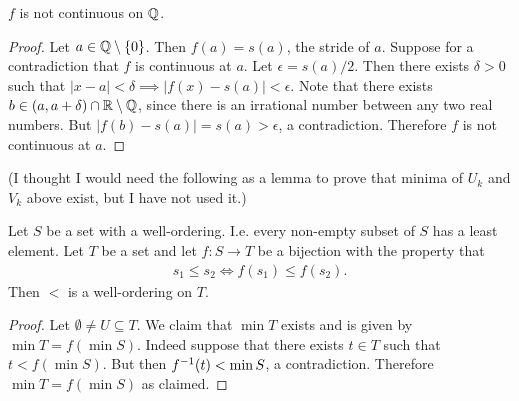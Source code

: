 \documentclass[12pt]{article}
\begin{document}
\begin{claim*}
  $f$ is not continuous on $\mathbb{Q}$.
\end{claim*}

\begin{proof}
  Let $a \in \mathbb{Q}\setminus\{0\}$. Then $f(a) = s(a)$, the stride of $a$. Suppose for a contradiction
  that $f$ is continuous at $a$. Let $\epsilon = s(a)/2$. Then there exists $\delta > 0$ such that
  $|x - a| < \delta \implies |f(x) - s(a)| < \epsilon$. Note that there exists
  $b \in (a, a + \delta) \cap \mathbb{R}\setminus\mathbb{Q}$, since there is an irrational number between any two
  real numbers. But $|f(b) - s(a)| = s(a) > \epsilon$, a contradiction. Therefore $f$ is not
  continuous at $a$.
\end{proof}

(I thought I would need the following as a lemma to prove that minima of $U_k$ and $V_k$ above
exist, but I have not used it.)
\begin{theorem*}
  Let $S$ be a set with a well-ordering. I.e. every non-empty subset of $S$ has a least
  element. Let $T$ be a set and let $f:S \to T$ be a bijection with the property that
  \begin{align*}
    s_1 \leq s_2 \iff f(s_1) \leq f(s_2).
  \end{align*}
  Then $<$ is a well-ordering on $T$.
\end{theorem*}
\begin{proof}
  Let $\emptyset \neq U \subseteq T$. We claim that $\min T$ exists and is given by
  $\min T = f(\min S)$. Indeed suppose that there exists $t \in T$ such that $t < f(\min S)$. But
  then $f^{-1}(t) < \min S$, a contradiction. Therefore $\min T = f(\min S)$ as claimed.
\end{proof}
\end{document}
